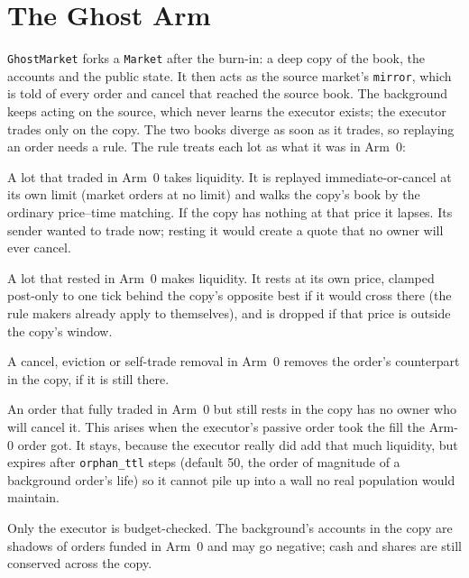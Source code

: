 \documentclass[11pt,a4paper]{article}
\newcommand{\code}[1]{\texttt{#1}}
\begin{document}
\section{The Ghost Arm}
\label{sec:ghost}

\code{GhostMarket} forks a \code{Market} after the burn-in: a deep copy of the book, the accounts and the public state. It
then acts as the source market's \code{mirror}, which is told of every order and cancel that reached the source book. The
background keeps acting on the source, which never learns the executor exists; the executor trades only on the copy. The
two books diverge as soon as it trades, so replaying an order needs a rule. The rule treats each lot as what it was in Arm~0:

\begin{description}[nosep]
\item[R1, takers.] A lot that traded in Arm~0 takes liquidity. It is replayed immediate-or-cancel at its own limit (market
  orders at no limit) and walks the copy's book by the ordinary price--time matching. If the copy has nothing at that price
  it lapses. Its sender wanted to trade now; resting it would create a quote that no owner will ever cancel.
\item[R2, makers.] A lot that rested in Arm~0 makes liquidity. It rests at its own price, clamped post-only to one tick
  behind the copy's opposite best if it would cross there (the rule makers already apply to themselves), and is dropped if that
  price is outside the copy's window.
\item[R3, removals.] A cancel, eviction or self-trade removal in Arm~0 removes the order's counterpart in the copy, if it is
  still there.
\item[R4, orphans.] An order that fully traded in Arm~0 but still rests in the copy has no owner who will cancel it. This
  arises when the executor's passive order took the fill the Arm-0 order got. It stays, because the executor really did add
  that much liquidity, but expires after \code{orphan\_ttl} steps (default 50, the order of magnitude of a background order's
  life) so it cannot pile up into a wall no real population would maintain.
\item[R5, budgets.] Only the executor is budget-checked. The background's accounts in the copy are shadows of orders funded in
  Arm~0 and may go negative; cash and shares are still conserved across the copy.
\end{description}
\end{document}
